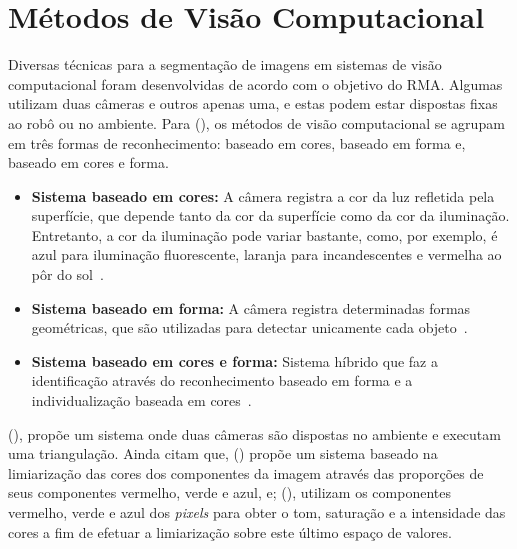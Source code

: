 \section{Métodos de Visão Computacional}
\label{sec:metodos-visaoComputacional}

Diversas técnicas para a segmentação de imagens em sistemas de visão computacional foram desenvolvidas de acordo com o objetivo do RMA. Algumas utilizam duas câmeras e outros apenas uma, e estas podem estar dispostas fixas ao robô ou no ambiente. Para \citeauthor{araujo2008reconhecimento} (\citeyear{araujo2008reconhecimento}), os métodos de visão computacional se agrupam em três formas de reconhecimento: baseado em cores, baseado em forma e, baseado em cores e forma.

\begin{itemize}
    \item \textbf{Sistema baseado em cores:} A câmera registra a cor da luz refletida pela superfície, que depende tanto da cor da superfície como da cor da iluminação. Entretanto, a cor da iluminação pode variar bastante, como, por exemplo, é azul para iluminação fluorescente, laranja para incandescentes e vermelha ao pôr do sol~\cite{konzen2007problema}.
    
    \item \textbf{Sistema baseado em forma:} A câmera registra determinadas formas geométricas, que são utilizadas para detectar unicamente cada objeto~\cite{garcia2007arcaboucco}.
    
    \item \textbf{Sistema baseado em cores e forma:} Sistema híbrido que faz a identificação através do reconhecimento baseado em forma e a individualização baseada em cores~\cite{martins2007towards}.
\end{itemize}


\citeauthor{andrade2006sistema} (\citeyear{andrade2006sistema}), propõe um sistema onde duas câmeras são dispostas no ambiente e executam uma triangulação. Ainda citam que, \citeauthor{souza2003desenvolvimento} (\citeyear{souza2003desenvolvimento}) propõe um sistema baseado na limiarização das cores dos componentes da imagem através das proporções de seus componentes vermelho, verde e azul, e; \citeauthor{penharbel2004filtro} (\citeyear{penharbel2004filtro}), utilizam os componentes vermelho, verde e azul dos \textit{pixels} para obter o tom, saturação e a intensidade das cores a fim de efetuar a limiarização sobre este último espaço de valores.

